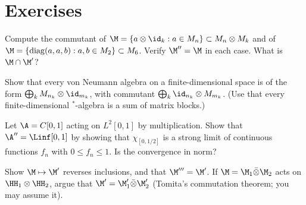 \section*{Exercises}
\begin{exercise}
Compute the commutant of $\M=\{a\otimes\id_k:a\in M_n\}\subset M_n\otimes M_k$ and of $\M=\{\mathrm{diag}(a,a,b):a,b\in M_2\}\subset M_6$. Verify $\M''=\M$ in each case. What is $\M\cap\M'$?
\end{exercise}
\begin{exercise}
Show that every von Neumann algebra on a finite-dimensional space is of the form $\bigoplus_kM_{n_k}\otimes\id_{m_k}$, with commutant $\bigoplus_k\id_{n_k}\otimes M_{m_k}$. (Use that every finite-dimensional $^*$-algebra is a sum of matrix blocks.)
\end{exercise}
\begin{exercise}
Let $\A=C[0,1]$ acting on $L^2[0,1]$ by multiplication. Show that $\A''=\Linf[0,1]$ by showing that $\chi_{[0,1/2]}$ is a strong limit of continuous functions $f_n$ with $0\le f_n\le1$. Is the convergence in norm?
\end{exercise}
\begin{exercise}
Show $\M\mapsto\M'$ reverses inclusions, and that $\M'''=\M'$. If $\M=\M_1\bar\otimes\M_2$ acts on $\HH_1\otimes\HH_2$, argue that $\M'=\M_1'\bar\otimes\M_2'$ (Tomita's commutation theorem; you may assume it).
\end{exercise}
